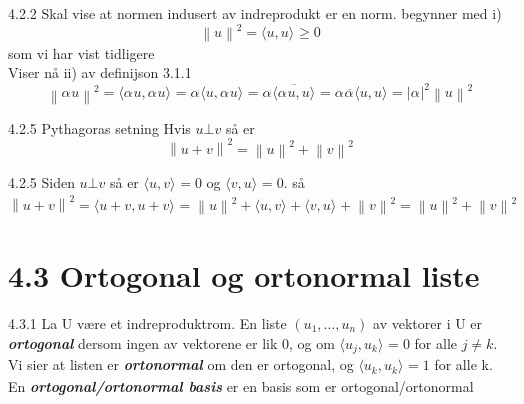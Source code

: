 \documentclass[a4paper,norsk]{article}
\renewcommand{\geq}{\geqslant}
\begin{document}
\begin{proofbox}{4.2.2}{}
Skal vise at normen indusert av indreprodukt er en norm. begynner med i)
\[
    \left\lVert u \right\rVert ^2 = \langle u, u \rangle_{  } \geq 0
\]
som vi har vist tidligere\\
Viser nå ii) av definijson 3.1.1    
\[
    \left\lVert \alpha_{}^{} u \right\rVert ^2 = \langle \alpha_{}^{} u , \alpha_{}^{}  u \rangle_{  } = \alpha_{}^{} \langle u, \alpha_{}^{} u \rangle_{  } = \alpha_{}^{} \overline{ \langle \alpha_{}^{} u, u \rangle_{  } } = \alpha_{}^{}  \overline{ \alpha_{}^{} } \langle u, u \rangle_{  } = \left| \alpha_{}^{}  \right| ^2 \left\lVert u \right\rVert ^2
\]
\end{proofbox}

\begin{theorembox}{4.2.5 Pythagoras setning}{}
Hvis $ u \bot v $ så er
\[
    \left\lVert u + v \right\rVert ^2 = \left\lVert u \right\rVert ^2 + \left\lVert v \right\rVert ^2
\]
\begin{proofbox}{4.2.5}{}
Siden $ u \bot v $ så er $ \langle u, v \rangle_{  } =0 $  og $ \langle v, u \rangle_{  }  =0$. så
\[
    \left\lVert u+v \right\rVert ^2 = \langle u+v, u+v \rangle_{  } = \left\lVert u \right\rVert ^2 + \langle u, v \rangle_{  } + \langle v, u \rangle_{  } + \left\lVert v \right\rVert ^2 = \left\lVert u \right\rVert ^2 + \left\lVert v \right\rVert ^2
\]
\end{proofbox}
\end{theorembox}

\section*{4.3 Ortogonal og ortonormal liste}

\begin{definitionbox}{4.3.1}{}
La U være et indreproduktrom. En liste $ \left( u_1,..., u_n \right)  $ av vektorer i U er \textbf{\textit{ortogonal}} dersom ingen av vektorene er lik 0, og om $ \langle u_j, u_k \rangle_{  } =  0 $ for alle $ j\neq k $. Vi sier at listen er \textbf{\textit{ortonormal}} om den er ortogonal, og $ \langle u_k, u_k \rangle_{  } =1 $ for alle k. En \textbf{\textit{ortogonal/ortonormal basis}} er en basis som er ortogonal/ortonormal
\end{definitionbox}
\end{document}
